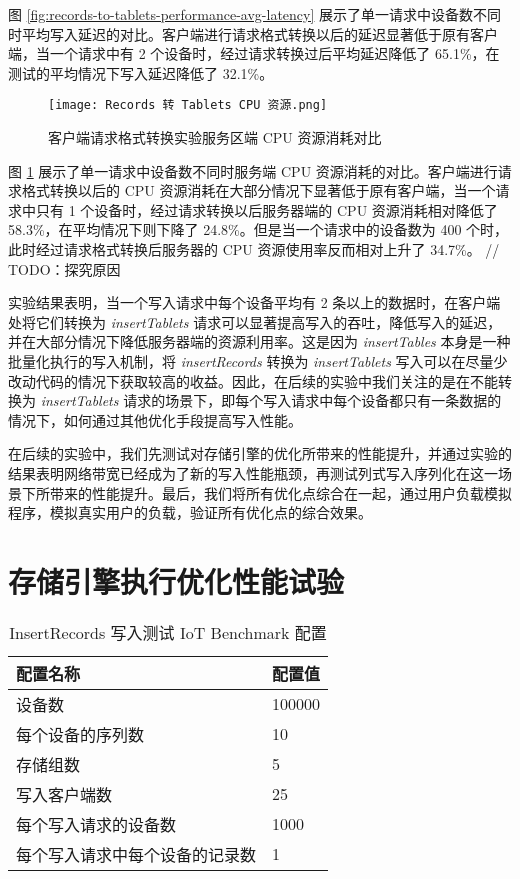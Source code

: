 图 \ref{fig:records-to-tablets-performance-avg-latency} 展示了单一请求中设备数不同时平均写入延迟的对比。客户端进行请求格式转换以后的延迟显著低于原有客户端，当一个请求中有 2 个设备时，经过请求转换过后平均延迟降低了 65.1\%，在测试的平均情况下写入延迟降低了 32.1\%。

\begin{figure}
  \centering
  \texttt{[image: Records 转 Tablets CPU 资源.png]}
  \caption{客户端请求格式转换实验服务区端 CPU 资源消耗对比}
  \label{fig:records-to-tablets-performance-cpu-consuming}
\end{figure}

图 \ref{fig:records-to-tablets-performance-cpu-consuming} 展示了单一请求中设备数不同时服务端 CPU 资源消耗的对比。客户端进行请求格式转换以后的 CPU 资源消耗在大部分情况下显著低于原有客户端，当一个请求中只有 1 个设备时，经过请求转换以后服务器端的 CPU 资源消耗相对降低了 58.3\%，在平均情况下则下降了 24.8\%。但是当一个请求中的设备数为 400 个时，此时经过请求格式转换后服务器的 CPU 资源使用率反而相对上升了 34.7\%。 // TODO：探究原因

实验结果表明，当一个写入请求中每个设备平均有 2 条以上的数据时，在客户端处将它们转换为 \emph{insertTablets} 请求可以显著提高写入的吞吐，降低写入的延迟，并在大部分情况下降低服务器端的资源利用率。这是因为 \emph{insertTables} 本身是一种批量化执行的写入机制，将 \emph{insertRecords} 转换为 \emph{insertTablets} 写入可以在尽量少改动代码的情况下获取较高的收益。因此，在后续的实验中我们关注的是在不能转换为 \emph{insertTablets} 请求的场景下，即每个写入请求中每个设备都只有一条数据的情况下，如何通过其他优化手段提高写入性能。

在后续的实验中，我们先测试对存储引擎的优化所带来的性能提升，并通过实验的结果表明网络带宽已经成为了新的写入性能瓶颈，再测试列式写入序列化在这一场景下所带来的性能提升。最后，我们将所有优化点综合在一起，通过用户负载模拟程序，模拟真实用户的负载，验证所有优化点的综合效果。

\section{存储引擎执行优化性能试验}
\begin{table}
  \centering
  \caption{InsertRecords 写入测试 IoT Benchmark 配置}
  \begin{tabular}{ll}
    \toprule
    配置名称 & 配置值 \\
    \midrule 
    设备数 & 100000 \\
    每个设备的序列数 & 10 \\
    存储组数 & 5 \\
    写入客户端数 & 25 \\
    每个写入请求的设备数 & 1000 \\
    每个写入请求中每个设备的记录数 & 1 \\
    \bottomrule
  \end{tabular}
  \label{tabular:test-req-format-iot-benchmark-config-2}
\end{table}

